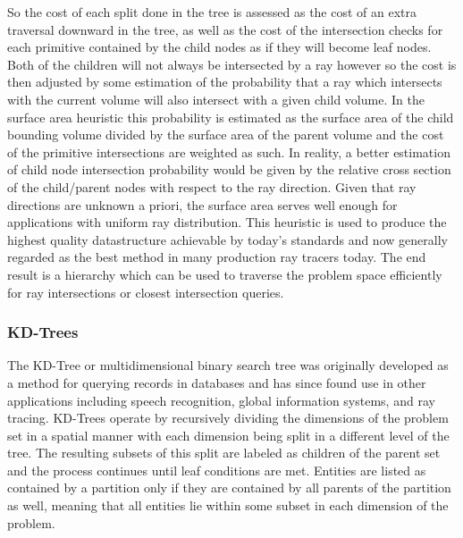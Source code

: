 \documentclass[12pt, a4paper]{article}
\begin{document}
So the cost of each split done in the tree is assessed as the cost of an extra traversal downward in the tree, as well as the cost of the intersection checks for each primitive contained by the child nodes as if they will become leaf nodes. Both of the children will not always be intersected by a ray however so the cost is then adjusted by some estimation of the probability that a ray which intersects with the current volume will also intersect with a given child volume. In the surface area heuristic this probability is estimated as the surface area of the child bounding volume divided by the surface area of the parent volume and the cost of the primitive intersections are weighted as such. In reality, a better estimation of  child node intersection probability would be given by the relative cross section of the child/parent nodes with respect to the ray direction. Given that ray directions are unknown a priori, the surface area serves well enough for applications with uniform ray distribution. This heuristic is used to produce the highest quality datastructure achievable by today's standards and now generally regarded as the best method in many production ray tracers today. The end result is a hierarchy which can be used to traverse the problem space efficiently for ray intersections or closest intersection queries.

\subsubsection{KD-Trees}%

The KD-Tree or multidimensional binary search tree was originally developed as a method for querying records in databases and has since found use in other applications including speech recognition, global information systems, and ray tracing. \cite{Bentley_1975} KD-Trees operate by recursively dividing the dimensions of the problem set in a spatial manner with each dimension being split in a different level of the tree. The resulting subsets of this split are labeled as children of the parent set and the process continues until leaf conditions are met. Entities are listed as contained by a partition only if they are contained by all parents of the partition as well, meaning that all entities lie within some subset in each dimension of the problem.
\end{document}
